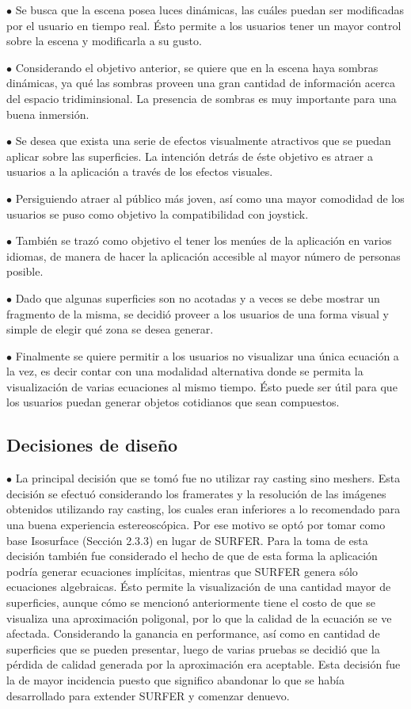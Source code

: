 \documentclass[12pt]{article}
\begin{document}
$\bullet$ Se busca que la escena posea  luces dinámicas, las cuáles puedan ser modificadas por el usuario en tiempo real. Ésto permite a los usuarios tener un mayor control sobre la escena y modificarla a su gusto.

$\bullet$ Considerando el objetivo anterior, se quiere que en la escena haya sombras dinámicas, ya qué las sombras proveen una gran cantidad de información acerca del espacio tridiminsional. La presencia de sombras es muy importante para una buena inmersión.

$\bullet$ Se desea que exista una serie de efectos visualmente atractivos que se puedan aplicar sobre las superficies. La intención detrás de éste objetivo es atraer a usuarios a la aplicación a través de los efectos visuales.

$\bullet$ Persiguiendo atraer al público más joven, así como una mayor comodidad de los usuarios se puso como objetivo la compatibilidad con joystick.

$\bullet$ También se trazó como objetivo el tener los menúes de la aplicación en varios idiomas, de manera de hacer la aplicación accesible al mayor número de personas posible.

$\bullet$ Dado que algunas superficies son no acotadas y a veces se debe mostrar un fragmento de la misma, se decidió proveer a los usuarios de una forma visual y simple de elegir qué zona se desea generar.

$\bullet$ Finalmente se quiere permitir a los usuarios no visualizar una única ecuación a la vez, es decir contar con una modalidad alternativa donde se permita la visualización de varias ecuaciones al mismo tiempo. Ésto puede ser útil para que los usuarios puedan generar objetos cotidianos que sean compuestos.

\subsection{Decisiones de diseño}
$\bullet$ La principal decisión que se tomó fue no utilizar ray casting sino meshers. Esta decisión se efectuó considerando los framerates y la resolución de las imágenes obtenidos utilizando ray casting, los cuales eran inferiores a lo recomendado para una buena experiencia estereoscópica. Por ese motivo se optó por tomar como base Isosurface (Sección 2.3.3) en lugar de SURFER. Para la toma de esta decisión también fue considerado el hecho de que de esta forma la aplicación podría generar ecuaciones implícitas, mientras que SURFER genera sólo ecuaciones algebraicas. Ésto permite la visualización de una cantidad mayor de superficies, aunque cómo se mencionó anteriormente tiene el costo de que se visualiza una aproximación poligonal, por lo que la calidad de la ecuación se ve afectada. Considerando la ganancia en performance, así como en cantidad de superficies que se pueden presentar, luego de varias pruebas se decidió que la pérdida de calidad generada por la aproximación era aceptable. Esta decisión fue la de mayor incidencia puesto que significo abandonar lo que se había desarrollado para extender SURFER y comenzar denuevo.
\end{document}
